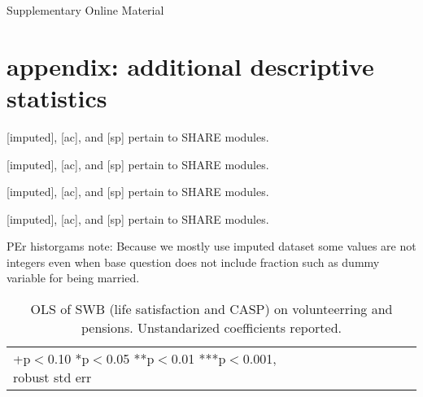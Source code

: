 \documentclass[10pt, letterpaper]{article}
\begin{document}
\begin{spacing}{1.4}






{\huge Supplementary Online Material}

\section{appendix: additional descriptive statistics}

 
{\footnotesize [imputed], [ac], and [sp] pertain to SHARE modules.}
 
{\footnotesize [imputed], [ac], and [sp] pertain to SHARE modules.}
 
{\footnotesize [imputed], [ac], and [sp] pertain to SHARE modules.}
 
{\footnotesize [imputed], [ac], and [sp] pertain to SHARE modules.}

PEr historgams note: Because we mostly use imputed dataset some values are not integers even when base
question does not include fraction such as dummy variable for being married. 








\begin{spacing}{.9}
\begin{table}[H]\centering \caption{OLS of SWB  (life satisfaction and CASP) on
    volunteerring and pensions.  Unstandarized coefficients reported.}  \begin{scriptsize} \begin{tabular}{p{1.8in}p{.5in}p{.5in}p{.5in}p{.5in}|p{.5in}p{.5in}p{.5in}p{.5in}p{.5in}p{.4in}p{.5in}p{.4in}}\hline 
      \hline\multicolumn{5}{l}{+p$<$0.10 *p$<$0.05 **p$<$0.01 ***p$<$0.001,
        robust std err} \end{tabular}\label{regEw6w4} \end{scriptsize}\end{table}
\end{spacing}




\end{spacing}
\end{document}
